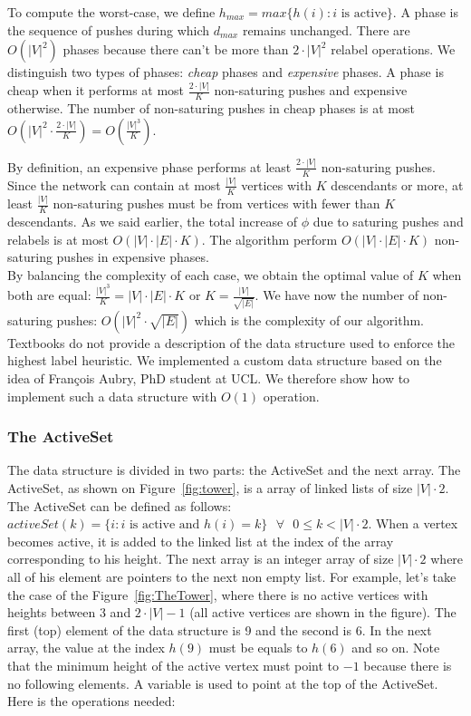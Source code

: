 To compute the worst-case, we define $h_{max} = max\{h(i) : i\text{ is active}\}$. A phase is the sequence of pushes during which $d_{max}$ remains unchanged. There are $O(|V|^2)$ phases because there can't be more than $2\cdot|V|^2$ relabel operations. We distinguish two types of phases: \textit{cheap} phases and \textit{expensive} phases. A phase is cheap when it performs at most $\frac{2\cdot|V|}{K}$ non-saturing pushes and expensive otherwise. The number of non-saturing pushes in cheap phases is at most $O(|V|^2 \cdot \frac{2\cdot|V|}{K}) = O(\frac{|V|^3}{K})$.

By definition, an expensive phase performs at least $\frac{2\cdot|V|}{K}$ non-saturing pushes. Since the network can contain at most $\frac{|V|}{K}$ vertices with $K$ descendants or more, at least $\frac{|V|}{K}$ non-saturing pushes must be from vertices with fewer than $K$ descendants. As we said earlier, the total increase of $\phi$ due to saturing pushes and relabels is at most $O(|V|\cdot|E|\cdot K)$. The algorithm perform $O(|V|\cdot|E|\cdot K)$ non-saturing pushes in expensive phases.\\

By balancing the complexity of each case, we obtain the optimal value of $K$ when both are equal: $\frac{|V|^3}{K} = |V|\cdot|E|\cdot K$ or $K = \frac{|V|}{\sqrt{|E|}}$. We have now the number of non-saturing pushes: $O(|V|^2\cdot\sqrt{|E|})$ which is the complexity of our algorithm.\\

Textbooks do not provide a description of the data structure used to enforce the highest label heuristic. We implemented a custom data structure based on the idea of Fran\c cois Aubry, PhD student at UCL. We therefore show how to implement such a data structure with $O(1)$ operation.

\subsubsection{The ActiveSet}

The data structure is divided in two parts: the ActiveSet and the next array. The ActiveSet, as shown on Figure~\ref{fig:tower}, is a array of linked lists of size $|V|\cdot 2$. The ActiveSet can be defined as follows: $activeSet(k) = \{i : i \text{ is active and } h(i) = k\} \text{ } \forall \text{ } 0 \le k < |V|\cdot 2$. When a vertex becomes active, it is added to the linked list at the index of the array corresponding to his height. The next array is an integer array of size $|V| \cdot 2$ where all of his element are pointers to the next non empty list. For example, let's take the case of the Figure~\ref{fig:TheTower}, where there is no active vertices with heights between 3 and $2 \cdot |V|-1$ (all active vertices are shown in the figure). The first (top) element of the data structure is 9 and the second is 6. In the next array, the value at the index $h(9)$ must be equals to $h(6)$ and so on. Note that the minimum height of the active vertex must point to $-1$ because there is no following elements. A variable is used to point at the top of the ActiveSet. Here is the operations needed:

